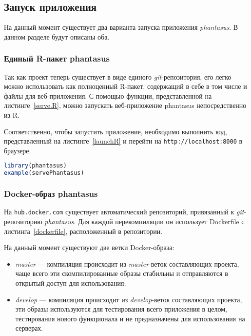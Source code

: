 \subsection{Запуск приложения}
На данный момент существует два варианта запуска приложения \emph{phantasus}. В данном разделе будут описаны оба.
\subsubsection{Единый R-пакет phantasus}
Так как проект теперь существует в виде  единого \emph{git}-репозитория, его легко можно использовать как полноценный R-пакет, содержащий в себе в том числе и файлы для веб-приложения.
С помощью функции, представленной на листинге~\ref{serve.R}, можно запускать веб-приложение phantasus непосредственно из R.


Соответственно, чтобы запустить приложение, необходимо выполнить код, представленный на листинге~\ref{launchR} и перейти на \texttt{http://localhost:8000} в браузере.

\begin{lstlisting}[float=!h,language=R,label={launchR},caption={Запуск приложения в качестве R-пакета}]
library(phantasus)
example(servePhantasus)
\end{lstlisting}

\subsubsection{Docker-образ phantasus}
На \texttt{hub.docker.com} существует автоматический репозиторий, привязанный к \emph{git}-репозиторию \emph{phantasus}. Для каждой перекомпиляции он использует Dockerfile с листинга~\ref{dockerfile}, расположенный в репозитории.

На данный момент существуют две ветки Docker-образа:
\begin{itemize}
\item \emph{master} --- компиляция происходит из \emph{master}-веток составляющих проекта, чаще всего эти скомпилированные образы стабильны и отправляются в открытый доступ для использования;
\item \emph{develop} --- компиляция происходит из \emph{develop}-веток составляющих проекта, эти образы используются для тестирования всего приложения в целом, тестирования нового функционала и не предназначены для использования на серверах.
\end{itemize}

